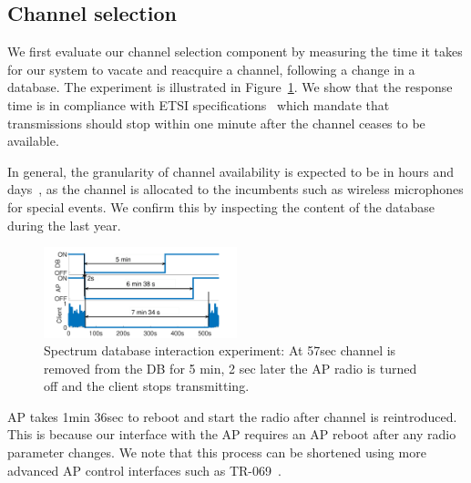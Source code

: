 \subsection{Channel selection}
\label{sec:database-eval}
We first evaluate our channel selection component by measuring the time it takes for our system to vacate and reacquire a channel, following a change in a database. The experiment is illustrated in Figure~\ref{fig:paws}.
We show that the response time is 
in compliance with ETSI specifications~\cite{etsi_tvws} which mandate that transmissions should stop within one minute after the channel ceases to be available.

In general, the granularity of channel availability is expected to be in hours and days~\cite{Rice_af}, as the channel is allocated to the incumbents such as wireless microphones for special events. We confirm this by inspecting the content of the database during the last year. 
 

\begin{figure}[htb!]
  \vskip -12pt
  \centering
  \hskip -8pt
    \includegraphics[width=0.5\textwidth]{./figs/paws.pdf}
  \vskip -6pt
  \caption{\small{Spectrum database interaction experiment: At 57sec channel is removed from the DB for 5 min, 2 sec later the AP radio is turned off and the client stops transmitting.}}
  \label{fig:paws}
  \vskip -6pt
\end{figure}


AP takes 1min 36sec to reboot and start the radio after channel is reintroduced. This is because our interface with the AP requires an AP reboot after any radio parameter changes. We note that this process can be shortened using more advanced AP control interfaces such as TR-069~\cite{tr69}. 

